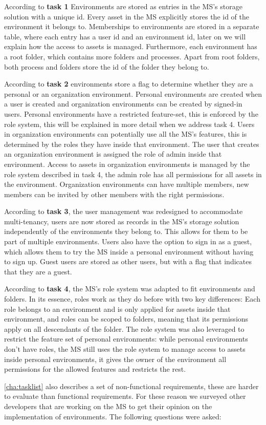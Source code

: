 According to \textbf{task 1} Environments are stored as entries in the MS's storage
solution with a unique id.
Every asset in the MS explicitly stores the id of the environment it belongs to.
Memberships to environments are stored in a separate table, where each entry has a user id
and an environment id,
later on we will explain how the access to assets is managed.
Furthermore, each environment has a root folder, which contains more folders and
processes.
Apart from root folders, both process and folders store the id of the folder they belong
to.

According to \textbf{task 2} environments store a flag to determine whether they are a
personal or an organization environment.
Personal environments are created when a user is created and organization environments can
be created by signed-in users.
Personal environments have a restricted feature-set, this is enforced by the role
system, this will be explained in more detail when we address task 4.
Users in organization environments can potentially use all the MS's features, this is
determined by the roles they have inside that environment.
The user that creates an organization environment is assigned the role of admin inside
that environment.
Access to assets in organization environments is managed by the role system described in
task 4,
the admin role has all permissions for all assets in the environment.
Organization environments can have multiple members, new members can be invited by other
members with the right permissions.

According to \textbf{task 3}, the user management was redesigned to accommodate
multi-tenancy,
users are now stored as records in the MS's storage solution independently of the environments they belong to.
This allows for them to be part of multiple environments.
Users also have the option to sign in as a guest, which allows them to try the MS inside
a personal environment without having to sign up.
Guest users are stored as other users, but with a flag that indicates that they are a
guest.

According to \textbf{task 4}, the MS's role system was adapted to fit environments and
folders. In its essence, roles work as they do before with two key differences:
Each role belongs to an environment and is only applied for assets inside that
environment, and roles can be scoped to folders, meaning that its permissions apply on all
descendants of the folder.
The role system was also leveraged to restrict the feature set of personal environments:
while personal environments don't have roles, the MS still uses the role system to manage
access to assets inside personal environments, it gives the owner of the environment all
permissions for the allowed features and restricts the rest.

\ref{cha:tasklist} also describes a set of non-functional requirements, these are harder
to evaluate than functional requirements. For these reason we surveyed other developers
that are working on the MS to get their opinion on the implementation of environments. 
The following questions were asked:


